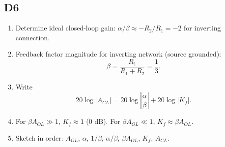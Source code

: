 \documentclass[12pt,a4paper]{article}
\begin{document}
\subsection{D6}
\begin{enumerate}
\item Determine ideal closed-loop gain: $\alpha/\beta\approx -R_2/R_1=-2$ for inverting connection.
\item Feedback factor magnitude for inverting network (source grounded):
\[
\beta=\frac{R_1}{R_1+R_2}=\frac{1}{3}.
\]
\item Write
\[
20\log|A_{CL}|=20\log\left|\frac{\alpha}{\beta}\right|+20\log|K_f|.
\]
\item For $\beta A_{OL}\gg1$, $K_f\approx1$ (0 dB). For $\beta A_{OL}\ll1$, $K_f\approx\beta A_{OL}$.
\item Sketch in order: $A_{OL}$, $\alpha$, $1/\beta$, $\alpha/\beta$, $\beta A_{OL}$, $K_f$, $A_{CL}$.
\end{enumerate}
\end{document}
